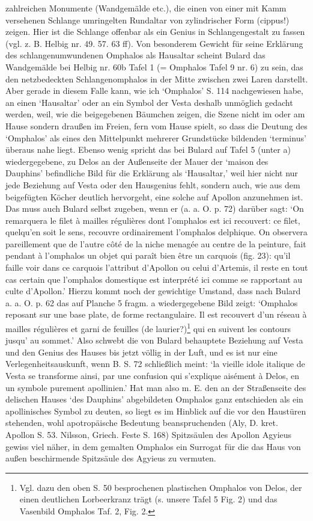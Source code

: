 \documentclass[a4paper, 11pt, oneside]{article}
\begin{document}
zahlreichen Monumente (Wandgemälde etc.), die einen von einer mit Kamm versehenen Schlange umringelten Rundaltar von zylindrischer Form (cippus!) zeigen. Hier ist die Schlange offenbar als ein Genius in Schlangengestalt zu fassen (vgl. z. B. Helbig nr. 49. 57. 63 ff). Von besonderem Gewicht für seine Erklärung des schlangenumwundenen Omphalos als Hausaltar scheint Bulard das Wandgemälde bei Helbig nr. 60b Tafel 1 (= Omphalos Tafel 9 nr. 6) zu sein, das den netzbedeckten Schlangenomphalos in der Mitte zwischen zwei Laren darstellt. Aber gerade in diesem Falle kann, wie ich `Omphalos' S. 114 nachgewiesen habe, an einen `Hausaltar' oder an ein Symbol der Vesta deshalb unmöglich gedacht werden, weil, wie die beigegebenen Bäumchen zeigen, die Szene nicht im oder am Hause sondern draußen im Freien, fern vom Hause spielt, so dass die Deutung des `Omphalos' als eines den Mittelpunkt mehrerer Grundstücke bildenden `terminus' überaus nahe liegt. Ebenso wenig spricht das bei Bulard auf Tafel 5 (unter a) wiedergegebene, zu Delos an der Außenseite der Mauer der `maison des Dauphins' befindliche Bild für die Erklärung als `Hausaltar,' weil hier nicht nur jede Beziehung auf Vesta oder den Hausgenius fehlt, sondern auch, wie aus dem beigefügten Köcher deutlich hervorgeht, eine solche auf Apollon anzunehmen ist. Das muss auch Bulard selbst zugeben, wenn er (a. a. O. p. 72) darüber sagt: `On remarquera le filet à mailles régulières dont l'omphalos est ici recouvert: ce filet, quelqu'en soit le sens, recouvre ordinairement l'omphalos delphique. On observera pareillement que de l'autre côté de la niche menagée au centre de la peinture, fait pendant à l'omphalos un objet qui paraît bien être un carquois (fig. 23): qu'il faille voir dans ce carquois l'attribut d'Apollon ou celui d'Artemis, il reste en tout cas certain que l'omphalos domestique est interprété ici comme se rapportant au culte d'Apollon.' Hierzu kommt noch der gewichtige Umstand, dass nach Bulard a. a. O. p. 62 das auf Planche 5 fragm. a wiedergegebene Bild zeigt: `Omphalos reposant sur une base plate, de forme rectangulaire. Il est recouvert d'un réseau à mailles régulières et garni de feuilles (de laurier?)\footnote{Vgl. dazu den oben S. 50 besprochenen plastischen Omphalos von Delos, der einen deutlichen Lorbeerkranz trägt (s. unsere Tafel 5 Fig. 2) und das Vasenbild Omphalos Taf. 2, Fig. 2.} qui en suivent les contours jusqu' au sommet.' Also schwebt die von Bulard behauptete Beziehung auf Vesta und den Genius des Hauses bis jetzt völlig in der Luft, und es ist nur eine Verlegenheitsauskunft, wenn B. S. 72 schließlich meint: `la vieille idole italique de Vesta se transforme ainsi, par une confusion qui s'explique aisément à Delos, en un symbole purement apollinien.' Hat man also m. E. den an der Straßenseite des delischen Hauses `des Dauphins' abgebildeten Omphalos ganz entschieden als ein apollinisches Symbol zu deuten, so liegt es im Hinblick auf die vor den Haustüren stehenden, wohl apotropäische Bedeutung beanspruchenden (Aly, D. kret. Apollon S. 53. Nilsson, Griech. Feste S. 168) Spitzsäulen des Apollon Agyieus gewiss viel näher, in dem gemalten Omphalos ein Surrogat für die das Haus von außen beschirmende Spitzsäule des Agyieus zu vermuten.
\end{document}

